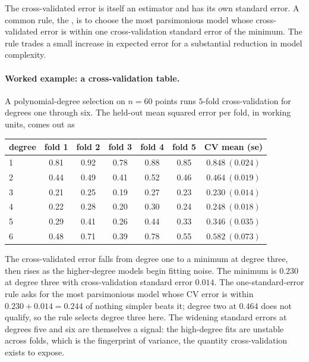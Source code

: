 The cross-validated error is itself an estimator and has its own
standard error. A common rule, the , is to choose the most parsimonious model whose
cross-validated error is within one cross-validation standard
error of the minimum. The rule trades a small increase in expected
error for a substantial reduction in model complexity.

\paragraph{Worked example: a cross-validation table.} A
polynomial-degree selection on $n = 60$ points runs $5$-fold
cross-validation for degrees one through six. The held-out mean
squared error per fold, in working units, comes out as

\begin{center}
\small
\begin{tabular}{lcccccc}
\toprule
degree & fold 1 & fold 2 & fold 3 & fold 4 & fold 5 & CV mean (se) \\
\midrule
1 & 0.81 & 0.92 & 0.78 & 0.88 & 0.85 & $0.848\ (0.024)$ \\
2 & 0.44 & 0.49 & 0.41 & 0.52 & 0.46 & $0.464\ (0.019)$ \\
3 & 0.21 & 0.25 & 0.19 & 0.27 & 0.23 & $0.230\ (0.014)$ \\
4 & 0.22 & 0.28 & 0.20 & 0.30 & 0.24 & $0.248\ (0.018)$ \\
5 & 0.29 & 0.41 & 0.26 & 0.44 & 0.33 & $0.346\ (0.035)$ \\
6 & 0.48 & 0.71 & 0.39 & 0.78 & 0.55 & $0.582\ (0.073)$ \\
\bottomrule
\end{tabular}
\end{center}

The cross-validated error falls from degree one to a minimum at
degree three, then rises as the higher-degree models begin fitting
noise. The minimum is $0.230$ at degree three with cross-validation
standard error $0.014$. The one-standard-error rule asks for the
most parsimonious model whose CV error is within $0.230 + 0.014 =
0.244$ of nothing simpler beats it; degree two at $0.464$ does not
qualify, so the rule selects degree three here. The widening
standard errors at degrees five and six are themselves a signal:
the high-degree fits are unstable across folds, which is the
fingerprint of variance, the quantity cross-validation exists to
expose.

